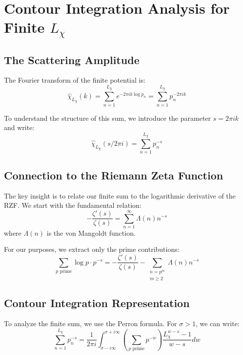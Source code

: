 \documentclass[11pt, oneside]{article}
\begin{document}
\section{Contour Integration Analysis for Finite $L_\chi$}

\subsection{The Scattering Amplitude}

The Fourier transform of the finite potential is:
\begin{equation}
\hat{\chi}_{L_\chi}(k) = \sum_{n=1}^{L_\chi} e^{-2\pi i k \log p_n} = \sum_{n=1}^{L_\chi} p_n^{-2\pi i k}
\end{equation}

To understand the structure of this sum, we introduce the parameter $s = 2\pi i k$ and write:
\begin{equation}
\hat{\chi}_{L_\chi}(s/2\pi i) = \sum_{n=1}^{L_\chi} p_n^{-s}
\end{equation}

\subsection{Connection to the Riemann Zeta Function}

The key insight is to relate our finite sum to the logarithmic derivative of the RZF. We start with the fundamental relation:
\begin{equation}
-\frac{\zeta'(s)}{\zeta(s)} = \sum_{n=1}^\infty \Lambda(n) n^{-s}
\end{equation}
where $\Lambda(n)$ is the von Mangoldt function.

For our purposes, we extract only the prime contributions:
\begin{equation}
\sum_{p \text{ prime}} \log p \cdot p^{-s} = -\frac{\zeta'(s)}{\zeta(s)} - \sum_{\substack{n=p^m \\ m \geq 2}} \Lambda(n) n^{-s}
\end{equation}

\subsection{Contour Integration Representation}

To analyze the finite sum, we use the Perron formula. For $\sigma > 1$, we can write:
\begin{equation}
\sum_{n=1}^{L_\chi} p_n^{-s} = \frac{1}{2\pi i} \int_{\sigma - i\infty}^{\sigma + i\infty} \left(\sum_{p \text{ prime}} p^{-w}\right) \frac{L_\chi^{w-s} - 1}{w-s} dw
\end{equation}
\end{document}
